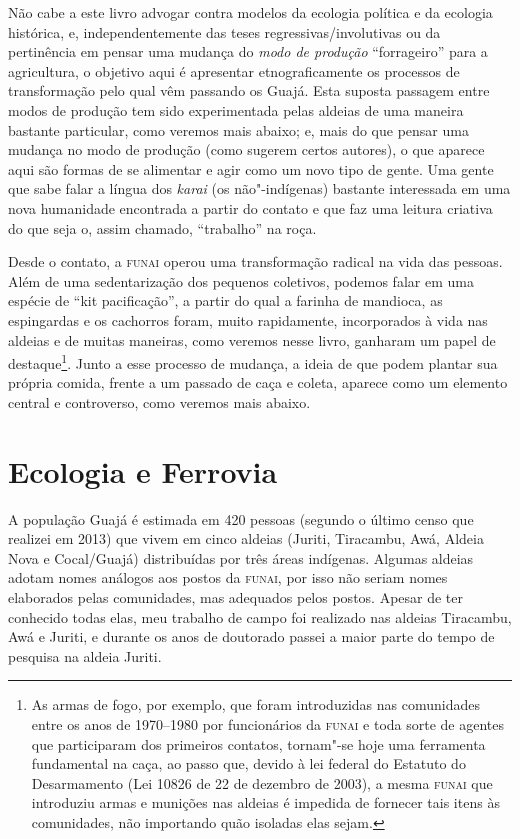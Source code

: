 Não cabe a este livro advogar contra modelos da ecologia política e da
ecologia histórica, e, independentemente das teses
regressivas/involutivas ou da pertinência em pensar uma mudança do
\emph{modo de produção} ``forrageiro'' para a agricultura, o objetivo
aqui é apresentar etnograficamente os processos de transformação pelo
qual vêm passando os Guajá. Esta suposta passagem entre modos de
produção tem sido experimentada pelas aldeias de uma maneira bastante
particular, como veremos mais abaixo; e, mais do que pensar uma mudança
no modo de produção (como sugerem certos autores), o que aparece aqui
são formas de se alimentar e agir como um novo tipo de gente. Uma gente
que sabe falar a língua dos \emph{karai} (os não"-indígenas) bastante
interessada em uma nova humanidade encontrada a partir do contato e que
faz uma leitura criativa do que seja o, assim chamado, ``trabalho'' na
roça.

Desde o contato, a \textsc{funai} operou uma transformação radical na vida das
pessoas. Além de uma sedentarização dos pequenos coletivos, podemos
falar em uma espécie de ``kit pacificação'', a partir do qual a farinha
de mandioca, as espingardas e os cachorros foram, muito rapidamente,
incorporados à vida nas aldeias e de muitas maneiras, como veremos nesse
livro, ganharam um papel de destaque\footnote{As armas de fogo, por
  exemplo, que foram introduzidas nas comunidades entre os anos de
  1970--1980 por funcionários da \textsc{funai} e toda sorte de agentes que
  participaram dos primeiros contatos, tornam"-se hoje uma ferramenta
  fundamental na caça, ao passo que, devido à lei federal do Estatuto do
  Desarmamento (Lei 10826 de 22 de dezembro de 2003), a mesma \textsc{funai} que
  introduziu armas e munições nas aldeias é impedida de fornecer tais
  itens às comunidades, não importando quão isoladas elas sejam.}. Junto
a esse processo de mudança, a ideia de que podem plantar sua própria
comida, frente a um passado de caça e coleta, aparece como um elemento
central e controverso, como veremos mais abaixo.

\section{Ecologia e Ferrovia }

A população Guajá é estimada em 420 pessoas (segundo o último censo que
realizei em 2013) que vivem em cinco aldeias (Juriti, Tiracambu, Awá, Aldeia Nova e Cocal/Guajá) distribuídas por três áreas
indígenas. Algumas aldeias adotam nomes análogos aos postos da \textsc{funai},
por isso não seriam nomes elaborados pelas comunidades, mas adequados
pelos postos. Apesar de ter conhecido todas elas, meu trabalho de campo
foi realizado nas aldeias Tiracambu, Awá e Juriti, e durante os
anos de doutorado passei a maior parte do tempo de pesquisa na aldeia
Juriti.

